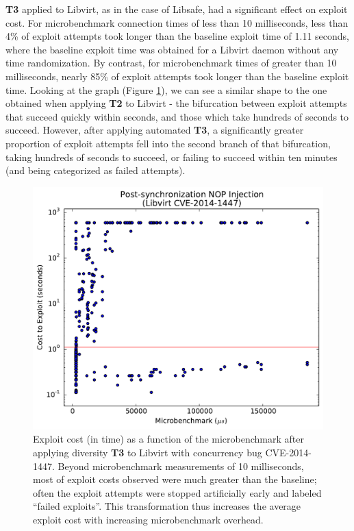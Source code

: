 \textbf{T3} applied to Libvirt, as in the case of Libsafe, had a significant effect on exploit cost.
For microbenchmark connection times of less than 10 milliseconds, less than 4\% of exploit attempts took longer than the baseline exploit time of 1.11 seconds, where the baseline exploit time was obtained for a Libvirt daemon without any time randomization.
By contrast, for microbenchmark times of greater than 10 milliseconds, nearly 85\% of exploit attempts took longer than the baseline exploit time.
Looking at the graph (Figure \ref{fig_libvirt-post}), we can see a similar shape to the one obtained when applying \textbf{T2} to Libvirt - the bifurcation between exploit attempts that succeed quickly within seconds, and those which take hundreds of seconds to succeed.
However, after applying automated \textbf{T3}, a significantly greater proportion of exploit attempts fell into the second branch of that bifurcation, taking hundreds of seconds to succeed, or failing to succeed within ten minutes (and being categorized as failed attempts).
\begin{figure}
	\centering
	\includegraphics[width=\columnwidth]{figures/libvirt-post}
	\caption{
		Exploit cost (in time) as a function of the microbenchmark after applying diversity \textbf{T3} to Libvirt with concurrency bug CVE-2014-1447.
		Beyond microbenchmark measurements of 10 milliseconds, most of exploit costs observed were much greater than the baseline; often the exploit attempts were stopped artificially early and labeled ``failed exploits''.
		This transformation thus increases the average exploit cost with increasing microbenchmark overhead.
	}
	\label{fig_libvirt-post}
\end{figure}

